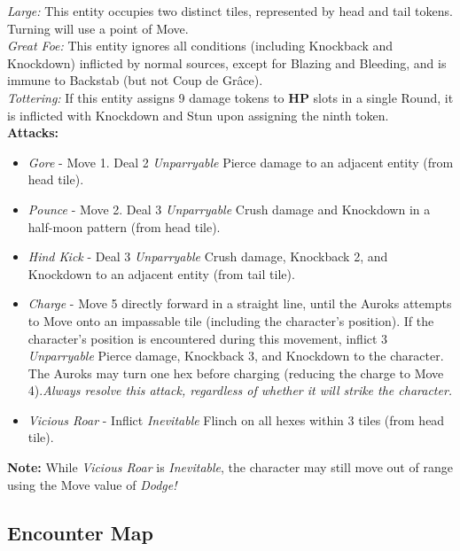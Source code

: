 \emph{Large:} This entity occupies two distinct tiles, represented by head and tail tokens. Turning will use a point of Move.\\

\emph{Great Foe:} This entity ignores all conditions (including Knockback and Knockdown) inflicted by normal sources, except for Blazing and Bleeding, and is immune to Backstab (but not Coup de Grâce).\\

\emph{Tottering:} If this entity assigns 9 damage tokens to \textbf{HP} slots in a single Round, it is inflicted with Knockdown and Stun upon assigning the ninth token.\\

\textbf{Attacks:}
\begin{itemize}
\item \emph{Gore} -  Move 1. Deal 2 \emph{Unparryable} Pierce damage to an adjacent entity (from head tile).
\item \emph{Pounce} - Move 2. Deal 3 \emph{Unparryable} Crush damage and Knockdown in a half-moon pattern (from head tile).
\item \emph{Hind Kick} - Deal 3 \emph{Unparryable} Crush damage, Knockback 2, and Knockdown to an adjacent entity (from tail tile).
\item \emph{Charge} - Move 5 directly forward in a straight line, until the Auroks attempts to Move onto an impassable tile (including the character’s position). If the character’s position is encountered during this movement, inflict 3 \emph{Unparryable} Pierce damage, Knockback 3, and Knockdown to the character. The Auroks may turn one hex before charging (reducing the charge to Move 4).\newline \emph{Always resolve this attack, regardless of whether it will strike the character.}
\item \emph{Vicious Roar} - Inflict \emph{Inevitable} Flinch on all hexes within 3 tiles (from head tile).
\end{itemize}

\begin{tcolorbox}
\textbf{Note:} While \emph{Vicious Roar} is \emph{Inevitable}, the character may still move out of range using the Move value of \emph{Dodge!}
\end{tcolorbox}

\pagebreak

\subsection*{Encounter Map}
\begin{center}
\end{center}


